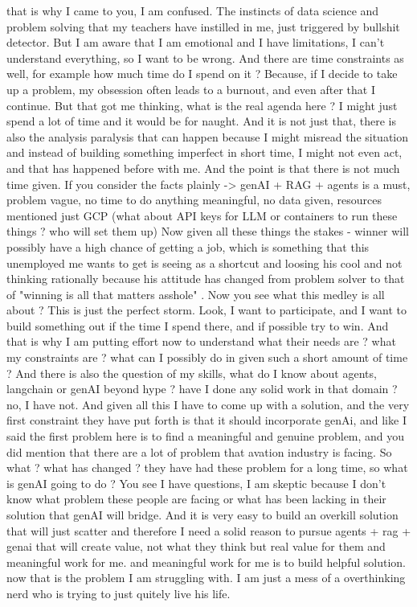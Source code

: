 \begin{userprompt}
that is why I came to you, I am confused. The instincts of data science and problem solving that my teachers have instilled in me, just triggered by bullshit detector. But I am aware that I am emotional and I have limitations, I can't understand everything, so I want to be wrong. And there are time constraints as well, for example how much time do I spend on it ? Because, if I decide to take up a problem, my obsession often leads to a burnout, and even after that I continue. But that got me thinking, what is the real agenda here ? I might just spend a lot of time and it would be for naught. And it is not just that, there is also the analysis paralysis that can happen because I might misread the situation and instead of building something imperfect in short time, I might not even act, and that has happened before with me. And the point is that there is not much time given. If you consider the facts plainly -> genAI + RAG + agents is a must, problem vague, no time to do anything meaningful, no data given, resources mentioned just GCP (what about API keys for LLM or containers to run these things ? who will set them up)
Now given all these things the stakes - winner will possibly have a high chance of getting a job, which is something that this unemployed me wants to get is seeing as a shortcut and loosing his cool and not thinking rationally because his attitude has changed from problem solver to that of "winning is all that matters asshole" .
Now you see what this medley is all about ? This is just the perfect storm. Look, I want to participate, and I want to build something out if the time I spend there, and if possible try to win. And that is why I am putting effort now to understand what their needs are ? what my constraints are ? what can I possibly do in given such a short amount of time ? And there is also the question of my skills, what do I know about agents, langchain or genAI beyond hype ? have I done any solid work in that domain ? no, I have not. And given all this I have to come up with a solution, and the very first constraint they have put forth is that it should incorporate genAi, and like I said the first problem here is to find a meaningful and genuine problem, and you did mention that there are a lot of problem that avation industry is facing. So what ? what has changed ? they have had these problem for a long time, so what is genAI going to do ? You see I have questions, I am skeptic because I don't know what problem these people are facing or what has been lacking in their solution that genAI will bridge. And it is very easy to build an overkill solution that will just scatter and therefore I need a solid reason to pursue agents + rag + genai that will create value, not what they think but real value for them and meaningful work for me. and meaningful work for me is to build helpful solution.
now that is the problem I am struggling with. I am just a mess of a overthinking nerd who is trying to just quitely live his life.
\end{userprompt}

